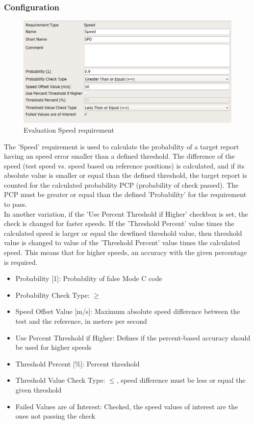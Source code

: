 \subsubsection{Configuration}

\begin{figure}[H]
    \includegraphics[width=14cm,frame]{figures/eval_req_speed.png}
  \caption{Evaluation Speed requirement}
\end{figure}

The 'Speed' requirement is used to calculate the probability of a target report having an speed error smaller than a defined threshold. The difference of the speed (test speed vs. speed based on reference positions) is calculated, and if its absolute value is smaller or equal than the defined threshold, the target report is counted for the calculated probability PCP (probability of check passed). The PCP must be greater or equal than the defined 'Probability' for the requirement to pass. \\

In another variation, if the 'Use Percent Threshold if Higher' checkbox is set, the check is changed for faster speeds. If the 'Threshold Percent' value times the calculated speed is larger or equal the dewfined threshold value, then threshold value is changed to value of the 'Threshold Percent' value times the calculated speed. This means that for higher speeds, an accuracy with the given percentage is required. \\

\begin{itemize}  
\item Probability [1]: Probability of false Mode C code
\item Probability Check Type: $\geq$
\item Speed Offset Value [m/s]: Maximum absolute speed difference between the test and the reference, in meters per second
\item Use Percent Threshold if Higher: Defines if the percent-based accuracy should be used for higher speeds
\item Threshold Percent [\%]: Percent threshold
\item Threshold Value Check Type: $\leq$, speed difference must be less or equal the given threshold
\item Failed Values are of Interest: Checked, the speed values of interest are the ones not passing the check
\end{itemize}
\ \\

